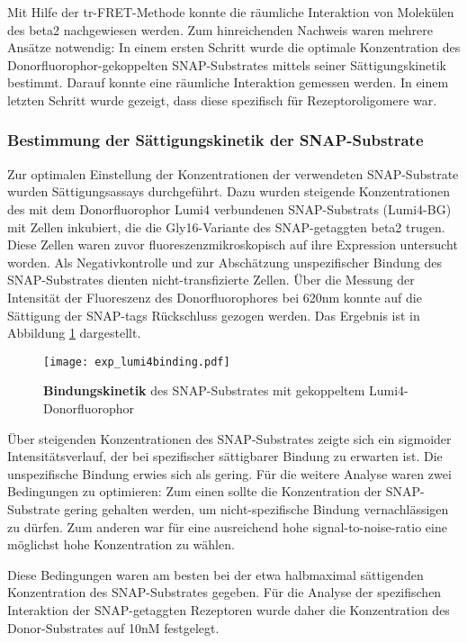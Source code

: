 Mit Hilfe der tr-FRET-Methode konnte die räumliche Interaktion von Molekülen des \gls{beta2} nachgewiesen werden. Zum hinreichenden Nachweis waren mehrere Ansätze notwendig: In einem ersten Schritt wurde die optimale Konzentration des Donorfluorophor-gekoppelten SNAP-Substrates mittels seiner Sättigungskinetik bestimmt. Darauf konnte eine räumliche Interaktion gemessen werden. In einem letzten Schritt wurde gezeigt, dass diese spezifisch für Rezeptoroligomere war.

\subsubsection{Bestimmung der Sättigungskinetik der SNAP-Substrate}
Zur optimalen Einstellung der Konzentrationen der verwendeten SNAP-Substrate wurden Sättigungsassays durchgeführt. Dazu wurden steigende Konzentrationen des mit dem Donorfluorophor Lumi4 verbundenen SNAP-Substrats (Lumi4-BG) mit Zellen inkubiert, die die Gly16-Variante des SNAP-getaggten \gls{beta2} trugen. Diese Zellen waren zuvor fluoreszenzmikroskopisch auf ihre Expression untersucht worden. Als Negativkontrolle und zur Abschätzung unspezifischer Bindung des SNAP-Substrates dienten nicht-transfizierte Zellen. Über die Messung der Intensität der Fluoreszenz des Donorfluorophores bei 620nm konnte auf die Sättigung der SNAP-tags Rückschluss gezogen werden. Das Ergebnis ist in Abbildung \ref{fig:lumi4binding} dargestellt.

\begin{figure}[htbp]
	\centering
    \texttt{[image: exp\_lumi4binding.pdf]}
    \caption{\textbf{Bindungskinetik} des SNAP-Substrates mit gekoppeltem Lumi4-Donorfluorophor}
    \label{fig:lumi4binding}
\end{figure}

Über steigenden Konzentrationen des SNAP-Substrates zeigte sich ein sigmoider Intensitätsverlauf, der bei spezifischer sättigbarer Bindung zu erwarten ist. Die unspezifische Bindung erwies sich als gering. Für die weitere Analyse waren zwei Bedingungen zu optimieren: Zum einen sollte die Konzentration der SNAP-Substrate gering gehalten werden, um nicht-spezifische Bindung vernachlässigen zu dürfen. Zum anderen war für eine ausreichend hohe signal-to-noise-ratio eine möglichst hohe Konzentration zu wählen.

Diese Bedingungen waren am besten bei der etwa halbmaximal sättigenden Konzentration des SNAP-Substrates gegeben. Für die Analyse der spezifischen Interaktion der SNAP-getaggten Rezeptoren wurde daher die Konzentration des Donor-Substrates auf 10\si{\nano M} festgelegt.


